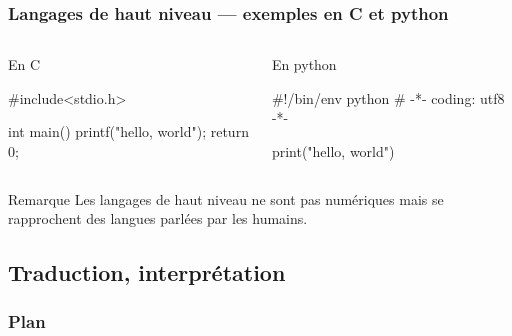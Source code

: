 \documentclass[utf8,10pt]{beamer}
\begin{document}
\begin{frame}[fragile]
    \frametitle{Langages de haut niveau --- exemples en C et python}
    \begin{columns}[t]
    
    \begin{column}{0.49\textwidth}
        \begin{block}{En C}
            \begin{pyglist}[language=C]
#include<stdio.h>
            
int main() {
printf("hello, world");
return 0;
}
            \end{pyglist}
        \end{block}

    \end{column}
    
    \hfill
    
    \begin{column}{0.49\textwidth}
        \begin{block}{En python}
            \begin{pyglist}[language=python]
#!/bin/env python
# -*- coding: utf8 -*-
            
print("hello, world")

            \end{pyglist}
        \end{block}
    \end{column}
    \end{columns}
    
    \begin{alertblock}{Remarque}
    Les langages de \og haut niveau \fg{} ne sont pas numériques mais se rapprochent
    des langues parlées par les humains.
    \end{alertblock}

\end{frame}


\subsection{Traduction, interprétation}

\begin{frame}

	\frametitle{Plan}
	
	\tableofcontents[currentsubsection]
\end{frame}
\end{document}
